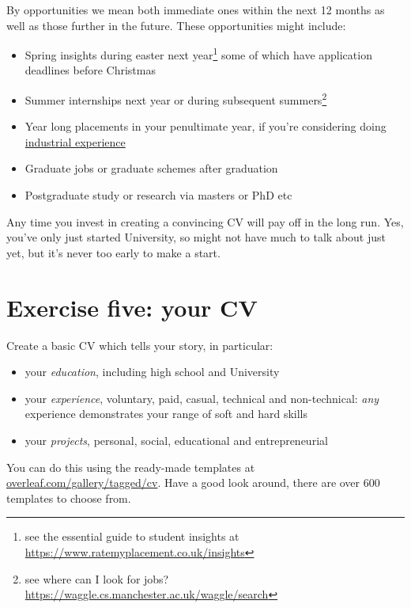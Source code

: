 \documentclass[
]{book}
\providecommand{\tightlist}{%
  \setlength{\itemsep}{0pt}\setlength{\parskip}{0pt}}
\begin{document}
By opportunities we mean both immediate ones within the next 12 months as well as those further in the future. These opportunities might include:

\begin{itemize}
\tightlist
\item
  Spring insights during easter next year\footnote{see the essential guide to student insights at \url{https://www.ratemyplacement.co.uk/insights}} some of which have application deadlines before Christmas
\item
  Summer internships next year or during subsequent summers\footnote{see where can I look for jobs? \url{https://waggle.cs.manchester.ac.uk/waggle/search}}
\item
  Year long placements in your penultimate year, if you're considering doing \href{http://studentnet.cs.manchester.ac.uk/employment/placement/}{industrial experience}
\item
  Graduate jobs or graduate schemes after graduation
\item
  Postgraduate study or research via masters or PhD etc
\end{itemize}

Any time you invest in creating a convincing CV will pay off in the long run. Yes, you've only just started University, so might not have much to talk about just yet, but it's never too early to make a start.

\hypertarget{ex5}{%
\section{Exercise five: your CV}\label{ex5}}

Create a basic CV which tells your story, in particular:

\begin{itemize}
\tightlist
\item
  your \emph{education}, including high school and University
\item
  your \emph{experience}, voluntary, paid, casual, technical and non-technical: \emph{any} experience demonstrates your range of soft and hard skills
\item
  your \emph{projects}, personal, social, educational and entrepreneurial
\end{itemize}

You can do this using the ready-made templates at \href{https://www.overleaf.com/gallery/tagged/cv}{overleaf.com/gallery/tagged/cv}. Have a good look around, there are over 600 templates to choose from.
\end{document}
